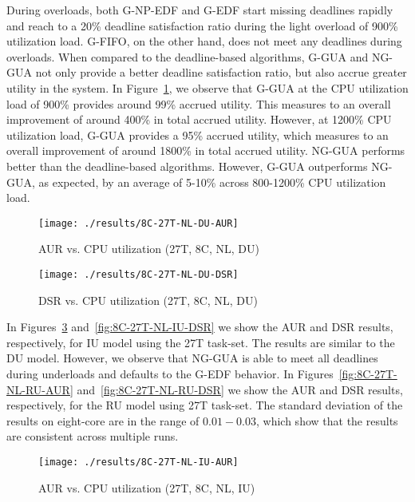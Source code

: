\documentclass[12pt,dvips]{report}
\begin{document}
During overloads, both G-NP-EDF and G-EDF start missing deadlines rapidly and reach to a 20\% deadline satisfaction ratio during the light overload of 900\% utilization load. G-FIFO, on the other hand, does not meet any deadlines during overloads. When compared to the deadline-based algorithms, G-GUA and NG-GUA not only provide a better deadline satisfaction ratio, but also accrue greater utility in the system. In Figure~\ref{fig:8C-27T-NL-DU-AUR}, we observe that G-GUA at the CPU utilization load of 900\% provides around 99\% accrued utility. This measures to an overall improvement of around 400\% in total accrued utility. However, at 1200\% CPU utilization load, G-GUA provides a 95\% accrued utility, which measures to an overall improvement of around 1800\% in total accrued utility. NG-GUA performs better than the deadline-based algorithms. However, G-GUA outperforms NG-GUA, as expected, by an average of 5-10\% across 800-1200\% CPU utilization load. 

\begin{figure} [htbp]
  \centering
  \texttt{[image: ./results/8C-27T-NL-DU-AUR]}
  \caption{ AUR vs. CPU utilization (27T, 8C, NL, DU)}
  \label{fig:8C-27T-NL-DU-AUR}
\end{figure}
 
\begin{figure} [htbp]
  \centering
  \texttt{[image: ./results/8C-27T-NL-DU-DSR]}
  \caption{ DSR vs. CPU utilization (27T, 8C, NL, DU)} 
  \label{fig:8C-27T-NL-DU-DSR}
\end{figure}
 
In Figures~\ref{fig:8C-27T-NL-IU-AUR} and~\ref{fig:8C-27T-NL-IU-DSR} we show the AUR and DSR results, respectively, for IU model using the 27T task-set. The results are similar to the DU model. However, we observe that NG-GUA is able to meet all deadlines during underloads and defaults to the G-EDF behavior. In Figures~\ref{fig:8C-27T-NL-RU-AUR} and~\ref{fig:8C-27T-NL-RU-DSR} we show the AUR and DSR results, respectively, for the RU model using 27T task-set. The standard deviation of the results on eight-core are in the range of $0.01-0.03$, which show that the results are consistent across multiple runs.
 
\begin{figure} [htbp]
  \centering
  \texttt{[image: ./results/8C-27T-NL-IU-AUR]}
  \caption{ AUR vs. CPU utilization (27T, 8C, NL, IU)}
  \label{fig:8C-27T-NL-IU-AUR}
\end{figure}
 
\end{document}
